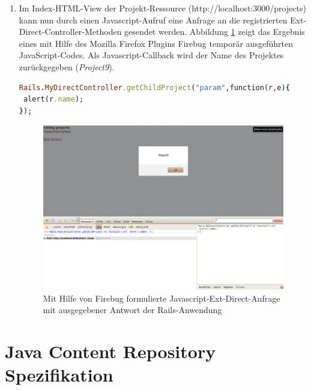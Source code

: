 \begin{enumerate}
\begin{lstlisting}[language=ruby,frame=single,title=\emph{app/controllers/projects\_controller.rb}, numbers=none]
class ProjectsController < ApplicationController

  # activate extr for this controller
  include Extr::DirectController


  #disable Rails 3 authenticity_token for demonstration, not recom. in production
  skip_before_filter :verify_authenticity_token


  #register 2 ext direct controller action with different, optional controller name (MyDirectController)
  direct "MyDirectController",
    :getChildProject => 1,
    :someOtherMethod => 2


  def getChildProject
    # render a random project name as json response
    render :json => {:name => "Project#{Random.rand(11)}"}.to_json
  end

\end{lstlisting}

\item
Im Index-HTML-View der Projekt-Ressource (http://localhost:3000/projects) kann nun durch einen Javascript-Aufruf eine Anfrage an die registrierten Ext-Direct-Controller-Methoden gesendet werden. Abbildung \ref{extrreqeust} zeigt das Ergebnis eines mit Hilfe des Mozilla Firefox Plugins Firebug temporär ausgeführten JavaScript-Codes.
Als Javascript-Callback wird der Name des Projektes zurückgegeben (\emph{Project9}).
\begin{lstlisting}[language=ruby,frame=single,title=\emph{Javascript zum Aufruf des Projekt-Controllers in der Rails-Anwendung}]
Rails.MyDirectController.getChildProject("param",function(r,e){
 alert(r.name);
});

\end{lstlisting}

\begin{figure}[!h]
\begin{center}
\includegraphics[scale=0.3]{images/anhang/extrbrowserrequest.png}
\caption{Mit Hilfe von Firebug formulierte Javascript-Ext-Direct-Anfrage mit ausgegebener Antwort der Rails-Anwendung}
\label{extrreqeust}
\end{center}
\end{figure}
\end{enumerate}

\section{Java Content Repository Spezifikation}
%

